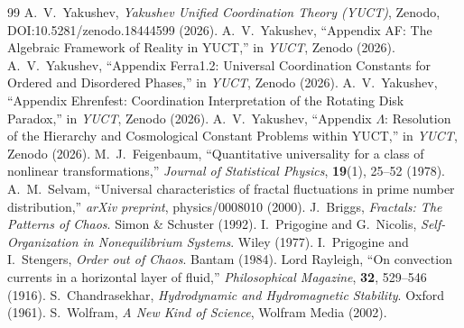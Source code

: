 \documentclass[11pt,a4paper]{article}
\begin{document}
	\begin{thebibliography}{99}
		 A.~V.~Yakushev, \emph{Yakushev Unified Coordination Theory (YUCT)}, Zenodo, DOI:10.5281/zenodo.18444599 (2026).
		 A.~V.~Yakushev, “Appendix AF: The Algebraic Framework of Reality in YUCT,” in \emph{YUCT}, Zenodo (2026).
		 A.~V.~Yakushev, “Appendix Ferra1.2: Universal Coordination Constants for Ordered and Disordered Phases,” in \emph{YUCT}, Zenodo (2026).
		 A.~V.~Yakushev, “Appendix Ehrenfest: Coordination Interpretation of the Rotating Disk Paradox,” in \emph{YUCT}, Zenodo (2026).
		 A.~V.~Yakushev, “Appendix $\Lambda$: Resolution of the Hierarchy and Cosmological Constant Problems within YUCT,” in \emph{YUCT}, Zenodo (2026).
		 M.~J.~Feigenbaum, “Quantitative universality for a class of nonlinear transformations,” \emph{Journal of Statistical Physics}, \textbf{19}(1), 25--52 (1978).
		 A.~M.~Selvam, “Universal characteristics of fractal fluctuations in prime number distribution,” \emph{arXiv preprint}, physics/0008010 (2000).
		 J.~Briggs, \emph{Fractals: The Patterns of Chaos}. Simon \& Schuster (1992).
		 I.~Prigogine and G.~Nicolis, \emph{Self-Organization in Nonequilibrium Systems}. Wiley (1977).
		 I.~Prigogine and I.~Stengers, \emph{Order out of Chaos}. Bantam (1984).
		 Lord Rayleigh, “On convection currents in a horizontal layer of fluid,” \emph{Philosophical Magazine}, \textbf{32}, 529--546 (1916).
		 S.~Chandrasekhar, \emph{Hydrodynamic and Hydromagnetic Stability}. Oxford (1961).
		 S.~Wolfram, \emph{A New Kind of Science}, Wolfram Media (2002).
	\end{thebibliography}
	
\end{document}
